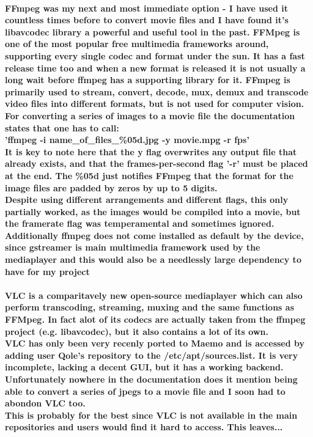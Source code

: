 \paragraph{FFmpeg was my next and most immediate option - I have used it countless times before to convert movie files and I have found it's libavcodec library a powerful and useful tool in the past. FFMpeg is one of the most popular free multimedia frameworks around, supporting every single codec and format under the sun. It has a fast release time too and when a new format is released it is not usually a long wait before ffmpeg has a supporting library for it. FFmpeg is primarily used to stream, convert, decode, mux, demux and transcode video files into different formats, but is not used for computer vision.\\
For converting a series of images to a movie file the documentation states that one has to call:\\
'ffmpeg -i name\_of\_files\_\%05d.jpg -y movie.mpg -r fps'\\
It is key to note here that the y flag overwrites any output file that already exists, and that the frames-per-second flag '-r' must be placed at the end. The \%05d just notifies FFmpeg that the format for the image files are padded by zeros by up to 5 digits.\\
Despite using different arrangements and different flags, this only partially worked, as the images would be compiled into a movie, but the framerate flag was temperamental and sometimes ignored.\\
Additionally ffmpeg does not come installed as default by the device, since gstreamer is main multimedia framework used by the mediaplayer and this would also be a needlessly large dependency to have for my project
}
\paragraph{VLC is a comparitavely new open-source mediaplayer which can also perform transcoding, streaming, muxing and the same functions as FFMpeg. In fact alot of its codecs are actually taken from the ffmpeg project (e.g. libavcodec), but it also contains a lot of its own.\\
VLC has only been very recenly ported to Maemo and is accessed by adding user Qole's repository to the /etc/apt/sources.list. It is very incomplete, lacking a decent GUI, but it has a working backend. Unfortunately nowhere in the documentation does it mention being able to convert a series of jpegs to a movie file and I soon had to abondon VLC too.\\ This is probably for the best since VLC is not available in the main repositories and users would find it hard to access. This leaves...}
